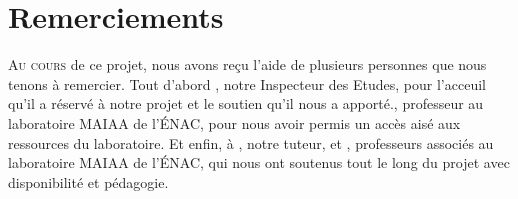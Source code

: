 \chapter*{Remerciements}

\lettrine{A}{u cours} de ce projet, nous avons reçu l'aide de plusieurs personnes que nous tenons à remercier.
Tout d'abord , notre Inspecteur des Etudes, pour l'acceuil qu'il a réservé à notre projet et le soutien qu'il nous a apporté., professeur au laboratoire MAIAA de l'ÉNAC, pour nous avoir permis un accès aisé aux ressources du laboratoire. Et enfin, à , notre tuteur, et , professeurs associés au laboratoire MAIAA de l'ÉNAC, qui nous ont soutenus tout le long du projet avec disponibilité et pédagogie.




